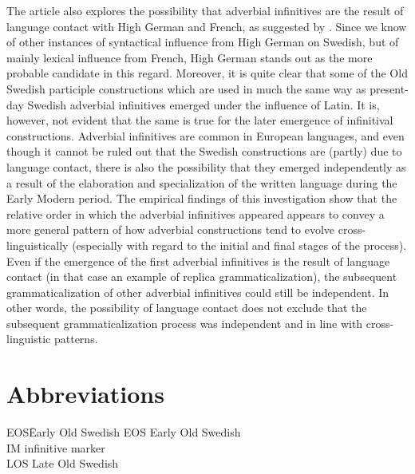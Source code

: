 \documentclass[output=paper]{langscibook}
\begin{document}
The article also explores the possibility that adverbial infinitives are the result of language contact with High German and French, as suggested by \citet{Holm1967}. Since we know of other instances of syntactical influence from High German on Swedish, but of mainly lexical influence from French, High German stands out as the more probable candidate in this regard. Moreover, it is quite clear that some of the Old Swedish participle constructions which are used in much the same way as present-day Swedish adverbial infinitives emerged under the influence of Latin. It is, however, not evident that the same is true for the later emergence of infinitival constructions. Adverbial infinitives are common in European languages, and even though it cannot be ruled out that the Swedish constructions are (partly) due to language contact, there is also the possibility that they emerged independently as a result of the elaboration and specialization of the written language during the Early Modern period. The empirical findings of this investigation show that the relative order in which the adverbial infinitives appeared appears to convey a more general pattern of how adverbial constructions tend to evolve cross-linguistically (especially with regard to the initial and final stages of the process). Even if the emergence of the first adverbial infinitives is the result of language contact (in that case an example of replica grammaticalization), the subsequent grammaticalization of other adverbial infinitives could still be independent. In other words, the possibility of language contact does not exclude that the subsequent grammaticalization process was independent and in line with cross-linguistic patterns. 


\section*{Abbreviations}
\begin{tabbing}
EOS\hspace{1ex}\= Early Old Swedish\kill
EOS \> Early Old Swedish\\
IM  \> infinitive marker\\
LOS \> Late Old Swedish\\
\end{tabbing}
\end{document}
